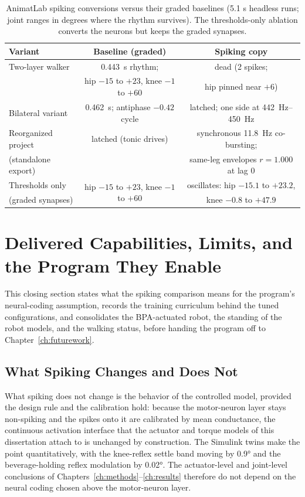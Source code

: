 \begin{table}[htbp]
\caption{AnimatLab spiking conversions versus their graded baselines (5.1 s headless runs; joint ranges in degrees where the rhythm survives). The thresholds-only ablation converts the neurons but keeps the graded synapses.}
\label{tab:spike_animatlab}
\small
\begin{tabular}{@{}lcc@{}}
\toprule
\textbf{Variant} & \textbf{Baseline (graded)} & \textbf{Spiking copy} \\
\midrule
Two-layer walker     & \qty{0.443}{\second} rhythm;   & dead (2 spikes; \\
                     & hip $-15$ to $+23$, knee $-1$ to $+60$ & hip pinned near $+6$) \\
Bilateral variant    & \qty{0.462}{\second}; antiphase $-0.42$ cycle & latched; one side at \qty{442}{\hertz}--\qty{450}{\hertz} \\
Reorganized project  & latched (tonic drives) & synchronous \qty{11.8}{\hertz} co-bursting; \\
(standalone export)  &                        & same-leg envelopes $r = 1.000$ at lag 0 \\
Thresholds only      & \multirow{2}{*}{hip $-15$ to $+23$, knee $-1$ to $+60$} & oscillates: hip $-15.1$ to $+23.2$, \\
(graded synapses)    &                        & knee $-0.8$ to $+47.9$ \\
\bottomrule
\end{tabular}
\end{table}

\section{Delivered Capabilities, Limits, and the Program They Enable}\label{sec:sns_discussion}

This closing section states what the spiking comparison means for the program's neural-coding assumption, records the training curriculum behind the tuned configurations, and consolidates the BPA-actuated robot, the standing of the robot models, and the walking status, before handing the program off to Chapter~\ref{ch:futurework}.

\subsection{What Spiking Changes and Does Not}\label{sec:disc_spiking}

What spiking does not change is the behavior of the controlled model, provided the design rule and the calibration hold: because the motor-neuron layer stays non-spiking and the spikes onto it are calibrated by mean conductance, the continuous activation interface that the actuator and torque models of this dissertation attach to is unchanged by construction. The Simulink twins make the point quantitatively, with the knee-reflex settle band moving by \ang{0.9} and the beverage-holding reflex modulation by \ang{0.02}. The actuator-level and joint-level conclusions of Chapters~\ref{ch:methods}--\ref{ch:results} therefore do not depend on the neural coding chosen above the motor-neuron layer.

